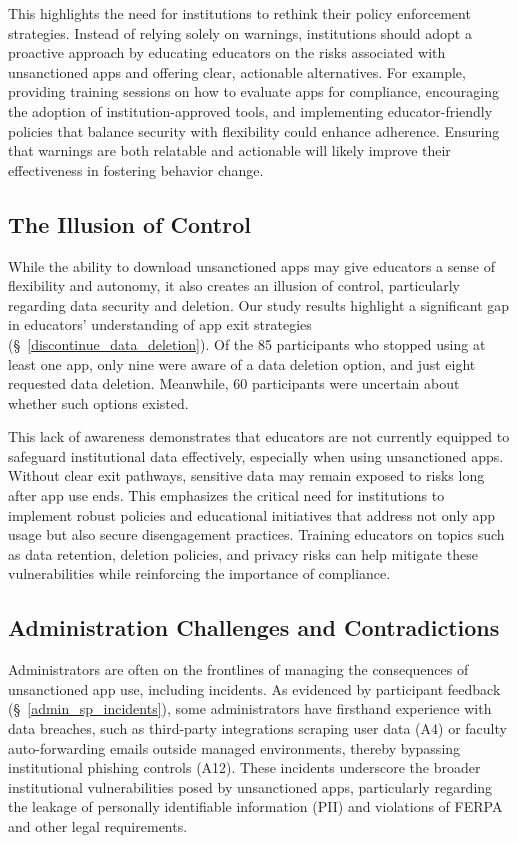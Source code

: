 This highlights the need for institutions to rethink their policy enforcement strategies. 
Instead of relying solely on warnings, institutions should adopt a proactive approach by educating educators on the risks associated with unsanctioned apps and offering clear, actionable alternatives. 
For example, providing training sessions on how to evaluate apps for compliance, encouraging the adoption of institution-approved tools, and implementing educator-friendly policies that balance security with flexibility could enhance adherence. Ensuring that warnings are both relatable and actionable will likely improve their effectiveness in fostering behavior change.

\subsection{The Illusion of Control}
While the ability to download unsanctioned apps may give educators a sense of flexibility and autonomy, it also creates an illusion of control, particularly regarding data security and deletion. 
Our study results highlight a significant gap in educators' understanding of app exit strategies (\S~\ref{discontinue_data_deletion}). 
Of the 85 participants who stopped using at least one app, only nine were aware of a data deletion option, and just eight requested data deletion. Meanwhile, 60 participants were uncertain about whether such options existed.  

This lack of awareness demonstrates that educators are not currently equipped to safeguard institutional data effectively, especially when using unsanctioned apps. 
Without clear exit pathways, sensitive data may remain exposed to risks long after app use ends. 
This emphasizes the critical need for institutions to implement robust policies and educational initiatives that address not only app usage but also secure disengagement practices. 
Training educators on topics such as data retention, deletion policies, and privacy risks can help mitigate these vulnerabilities while reinforcing the importance of compliance.

\subsection{Administration Challenges and Contradictions}
Administrators are often on the frontlines of managing the consequences of unsanctioned app use, including \sp incidents. 
As evidenced by participant feedback (\S~\ref{admin_sp_incidents}), some administrators have firsthand experience with data breaches, such as third-party integrations scraping user data (A4) or faculty auto-forwarding emails outside managed environments, thereby bypassing institutional phishing controls (A12). 
These incidents underscore the broader institutional vulnerabilities posed by unsanctioned apps, particularly regarding the leakage of personally identifiable information (PII) and violations of FERPA and other legal requirements.  

